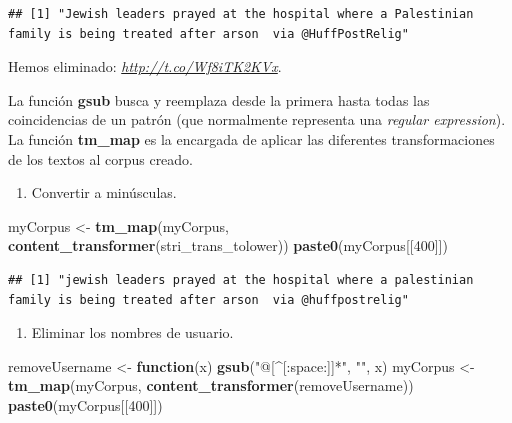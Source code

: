 \documentclass[
]{article}
\newenvironment{Shaded}{\begin{snugshade}}{\end{snugshade}}
\newcommand{\ControlFlowTok}[1]{\textcolor[rgb]{0.13,0.29,0.53}{\textbf{#1}}}
\newcommand{\DecValTok}[1]{\textcolor[rgb]{0.00,0.00,0.81}{#1}}
\newcommand{\KeywordTok}[1]{\textcolor[rgb]{0.13,0.29,0.53}{\textbf{#1}}}
\newcommand{\NormalTok}[1]{#1}
\newcommand{\StringTok}[1]{\textcolor[rgb]{0.31,0.60,0.02}{#1}}
\providecommand{\tightlist}{%
  \setlength{\itemsep}{0pt}\setlength{\parskip}{0pt}}
\begin{document}
\begin{verbatim}
## [1] "Jewish leaders prayed at the hospital where a Palestinian family is being treated after arson  via @HuffPostRelig"
\end{verbatim}

Hemos eliminado: \emph{\url{http://t.co/Wf8iTK2KVx}}.

La función \textbf{gsub} busca y reemplaza desde la primera hasta todas
las coincidencias de un patrón (que normalmente representa una
\emph{regular expression}). La función \textbf{tm\_map} es la encargada
de aplicar las diferentes transformaciones de los textos al corpus
creado.

\begin{enumerate}
\def\labelenumi{\arabic{enumi}.}
\setcounter{enumi}{1}
\tightlist
\item
  Convertir a minúsculas.
\end{enumerate}

\begin{Shaded}
\begin{Highlighting}[]
\NormalTok{myCorpus <-}\StringTok{ }\KeywordTok{tm_map}\NormalTok{(myCorpus, }\KeywordTok{content_transformer}\NormalTok{(stri_trans_tolower))}
\KeywordTok{paste0}\NormalTok{(myCorpus[[}\DecValTok{400}\NormalTok{]])}
\end{Highlighting}
\end{Shaded}

\begin{verbatim}
## [1] "jewish leaders prayed at the hospital where a palestinian family is being treated after arson  via @huffpostrelig"
\end{verbatim}

\begin{enumerate}
\def\labelenumi{\arabic{enumi}.}
\setcounter{enumi}{2}
\tightlist
\item
  Eliminar los nombres de usuario.
\end{enumerate}

\begin{Shaded}
\begin{Highlighting}[]
\NormalTok{removeUsername <-}\StringTok{ }\ControlFlowTok{function}\NormalTok{(x) }\KeywordTok{gsub}\NormalTok{(}\StringTok{"@[^[:space:]]*"}\NormalTok{, }\StringTok{""}\NormalTok{, x)  }
\NormalTok{myCorpus <-}\StringTok{ }\KeywordTok{tm_map}\NormalTok{(myCorpus, }\KeywordTok{content_transformer}\NormalTok{(removeUsername))}
\KeywordTok{paste0}\NormalTok{(myCorpus[[}\DecValTok{400}\NormalTok{]])}
\end{Highlighting}
\end{Shaded}
\end{document}
